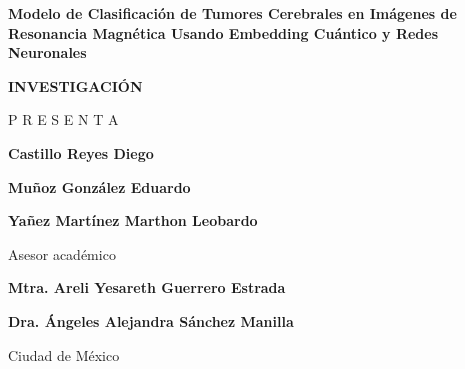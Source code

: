 \begin{titlepage}
    \vspace{2cm}
    
    {\LARGE \bfseries Modelo de Clasificación de Tumores Cerebrales en Imágenes de Resonancia Magnética Usando Embedding Cuántico y Redes Neuronales\par}
    
    \vspace{1.5cm}
    
    {\Large \bfseries INVESTIGACIÓN\par}
    
    \vfill
    
    {\large P R E S E N T A} \par
    \vspace{0.5cm}
    {\Large \bfseries Castillo Reyes Diego\par}
    {\Large \bfseries Muñoz González Eduardo\par}
    {\Large \bfseries Yañez Martínez Marthon Leobardo\par}
    
    \vspace{2cm}
    
    {\large Asesor académico}\par
    \vspace{0.5cm}
    {\Large \bfseries Mtra. Areli Yesareth Guerrero Estrada\par}
    {\Large \bfseries Dra. Ángeles Alejandra Sánchez Manilla\par}
    
    \vfill
    
    \begin{multicols}{2}
        {\large Ciudad de México\par}
        \columnbreak
    \end{multicols}
    
\end{titlepage}